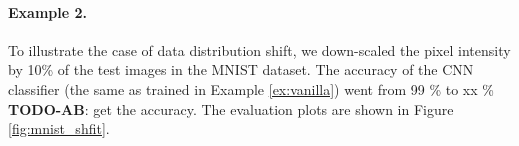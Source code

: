 \documentclass{article}
\newcommand{\todo}[2]{{\color{red} {\bf TODO-#1}: #2}}
\begin{document}
%	
%	
%	
%	
	
\paragraph{Example 2.} To illustrate the case of data distribution shift, we down-scaled the pixel intensity by 10\% of the test images in the MNIST dataset. The accuracy of the CNN classifier (the same as trained in Example \ref{ex:vanilla}) went from 99 \% to xx \% \todo{AB}{get the accuracy}. The evaluation plots are shown in Figure \ref{fig:mnist_shfit}.
\end{document}
